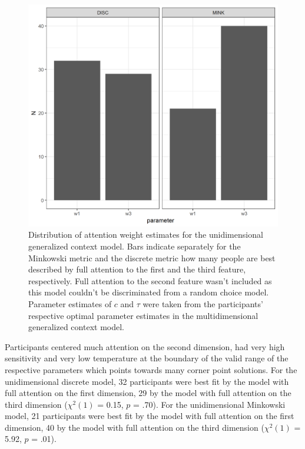 \documentclass[a4paper,man,natbib]{apa6}
\begin{document}
\begin{figure}[htbp]
\centering
\includegraphics[width = \textwidth]{fig_par_unidim.png}
\caption{Distribution of attention weight estimates for the unidimensional generalized context model. Bars indicate separately for the Minkowski metric and the discrete metric how many people are best described by full attention to the first and the third feature, respectively. Full attention to the second feature wasn't included as this model couldn't be discriminated from a random choice model. Parameter estimates of $c$ and $\tau$ were taken from the participants' respective optimal parameter estimates in the multidimensional generalized context model.}
\label{fig:par_unidim}
\end{figure}

Participants centered much attention on the second dimension, had very high sensitivity and very low temperature at the boundary of the valid range of the respective parameters which points towards many corner point solutions. For the unidimensional discrete model, 32 participants were best fit by the model with full attention on the first dimension, 29 by the model with full attention on the third dimension ($\chi^{2}(1)$ = 0.15, $p$ = .70). For the unidimensional Minkowski model, 21 participants were best fit by the model with full attention on the first dimension, 40 by the model with full attention on the third dimension ($\chi^{2}(1)$ = 5.92, $p$ = .01).
\end{document}
